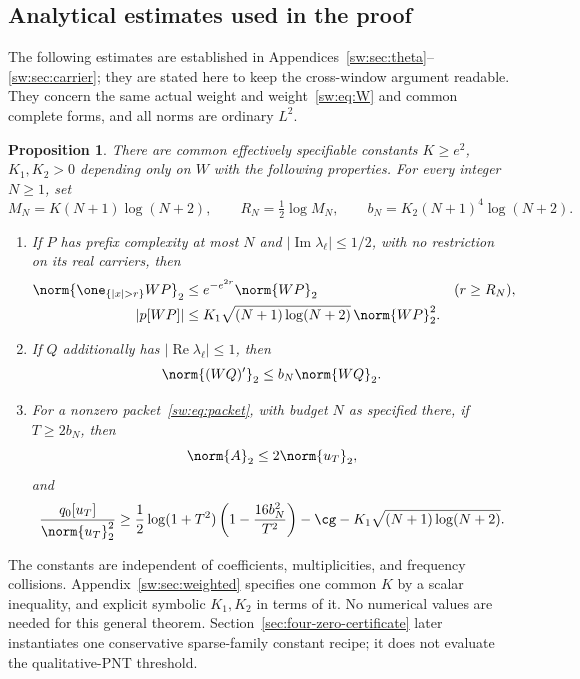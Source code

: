 \documentclass[11pt,a4paper]{article}
\numberwithin{equation}{section}
\newtheorem{proposition}[theorem]{Proposition}
\theoremstyle{definition}\newtheorem{definition}[theorem]{Definition}
\theoremstyle{remark}\newtheorem{remark}[theorem]{Remark}
\DeclareMathOperator{\Rea}{Re}\DeclareMathOperator{\Ima}{Im}
\begin{document}
\subsection{Analytical estimates used in the proof}\label{sw:sec:inputs}
The following estimates are established in Appendices~\ref{sw:sec:theta}--\ref{sw:sec:carrier}; they are stated here to keep the cross-window argument readable. They concern the same actual weight and weight~\eqref{sw:eq:W} and common complete forms, and all norms are ordinary $L^2$.

\begin{proposition}\label{sw:prop:analytic}
There are common effectively specifiable constants $K\ge e^2$, $K_1,K_2>0$ depending only on $W$ with the following properties. For every integer $N\ge1$, set
\begin{equation}\label{sw:eq:analytic-scales}
 M_N=K(N+1)\log(N+2),\qquad R_N=\tfrac12\log M_N,
 \qquad b_N=K_2(N+1)^4\log(N+2).
\end{equation}
\begin{enumerate}
\item If $P$ has prefix complexity at most $N$ and $|\Ima\lambda_\ell|\le1/2$, with no restriction on its real carriers, then
\begin{align}
 \norm{\one_{\{|x|>r\}}WP}_2&\le e^{-e^{2r}}\norm{WP}_2
                  &&(r\ge R_N),\label{sw:eq:input-tail}\\
 |p[WP]|&\le K_1\sqrt{(N+1)\log(N+2)}\,\norm{WP}_2^2.\label{sw:eq:prime-main}
\end{align}
\item If $Q$ additionally has $|\Rea\lambda_\ell|\le1$, then
\begin{equation}\label{sw:eq:deriv-main}
 \norm{(WQ)'}_2\le b_N\norm{WQ}_2.
\end{equation}
\item For a nonzero packet~\eqref{sw:eq:packet}, with budget $N$ as specified there, if $T\ge2b_N$, then
\begin{equation}\label{sw:eq:packet-norm}
 \norm{A}_2\le2\norm{u_T}_2,
\end{equation}
and
\begin{equation}\label{sw:eq:lower}
 \frac{q_0[u_T]}{\norm{u_T}_2^2}
 \ge\frac12\log(1+T^2)\left(1-\frac{16b_N^2}{T^2}\right)
       -\cg-K_1\sqrt{(N+1)\log(N+2)}.
\end{equation}
\end{enumerate}
\end{proposition}
The constants are independent of coefficients, multiplicities, and frequency collisions. Appendix~\ref{sw:sec:weighted} specifies one common $K$ by a scalar inequality, and explicit symbolic $K_1,K_2$ in terms of it. No numerical values are needed for this general theorem. Section~\ref{sec:four-zero-certificate} later instantiates one conservative sparse-family constant recipe; it does not evaluate the qualitative-PNT threshold.
\end{document}
